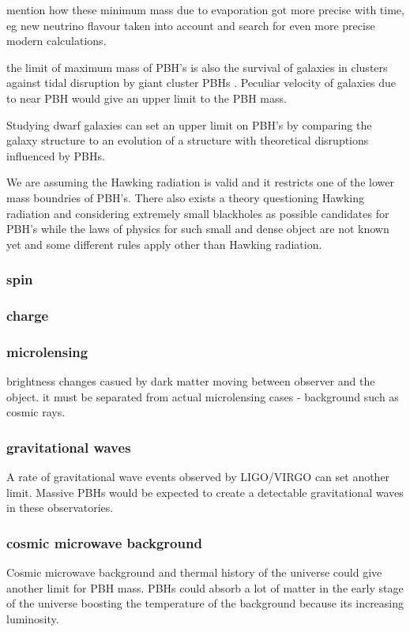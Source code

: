 \documentclass{article}
\begin{document}
mention how these minimum mass due to evaporation got more precise with time, eg new neutrino flavour taken into account and search for even more precise modern calculations.

the limit of maximum mass of PBH's is also the survival of galaxies in clusters against tidal disruption by giant cluster PBHs \cite{PBH_as_DM_candidate}. Peculiar velocity of galaxies due to near PBH would give an upper limit to the PBH mass. 

Studying dwarf galaxies can set an upper limit on PBH's by comparing the galaxy structure to an evolution of a structure with theoretical disruptions influenced by PBHs. 


We are assuming the Hawking radiation is valid and it restricts one of the lower mass boundries of PBH's. There also exists a theory questioning Hawking radiation and considering extremely small blackholes as possible candidates for PBH's while the laws of physics for such small and dense object are not known yet and some different rules apply other than Hawking radiation. 

\subsubsection {spin}
\subsubsection {charge}

\subsubsection {microlensing}
brightness changes casued by dark matter moving between observer and the object. \cite{GRIEST_1993_microlensing} 
it must be separated from actual microlensing cases - background such as cosmic rays. 

\subsubsection {gravitational waves}
A rate of gravitational wave events observed by LIGO/VIRGO can set another limit. Massive PBHs would be expected to create a detectable gravitational waves in these observatories.  \cite{PBH_as_DM_candidate}

\subsubsection {cosmic microwave background}
Cosmic microwave background and thermal history of the universe could give another limit for PBH mass. PBHs could absorb a lot of matter in the early stage of the universe boosting the temperature of the background because its increasing luminosity.  \cite{PBH_as_DM_candidate}
\end{document}
